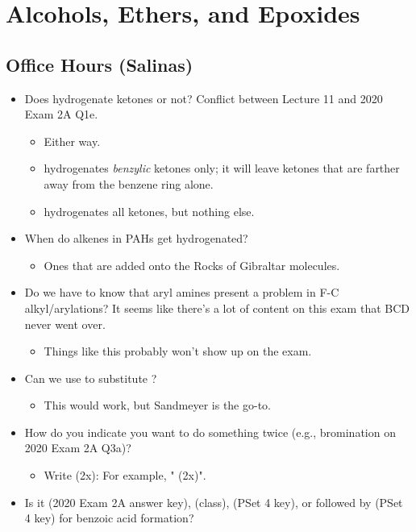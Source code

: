 \documentclass[../notes.tex]{subfiles}
\begin{document}
\chapter{Alcohols, Ethers, and Epoxides}
\section{Office Hours (Salinas)}
\begin{itemize}
    \item {}Does  hydrogenate ketones or not? Conflict between Lecture 11 and 2020 Exam 2A Q1e.
    \begin{itemize}
        \item Either way.
        \item {} hydrogenates \emph{benzylic} ketones only; it will leave ketones that are farther away from the benzene ring alone.
        \item {} hydrogenates all ketones, but nothing else.
    \end{itemize}
    \item When do alkenes in PAHs get hydrogenated?
    \begin{itemize}
        \item Ones that are added onto the Rocks of Gibraltar molecules.
    \end{itemize}
    \item Do we have to know that aryl amines present a problem in F-C alkyl/arylations? It seems like there's a lot of content on this exam that BCD never went over.
    \begin{itemize}
        \item Things like this probably won't show up on the exam.
    \end{itemize}
    \item Can we use  to substitute ?
    \begin{itemize}
        \item This would work, but Sandmeyer is the go-to.
    \end{itemize}
    \item How do you indicate you want to do something twice (e.g., bromination on 2020 Exam 2A Q3a)?
    \begin{itemize}
        \item Write (2x): For example, " (2x)".
    \end{itemize}
    \item Is it  (2020 Exam 2A answer key),  (class),  (PSet 4 key), or  followed by  (PSet 4 key) for benzoic acid formation?

\end{itemize}
\end{document}
